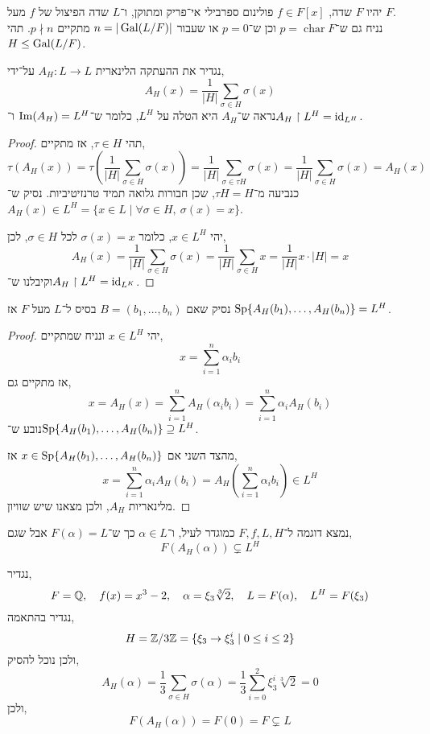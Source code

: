 \question{}
יהיו $F$ שדה, $f \in F[x]$ פולינום ספרבילי אי־פריק ומתוקן, ו־$L$ שדה הפיצול של $f$ מעל $F$. \\
נניח גם ש־$p = \operatorname{char} F$ וכן ש־$p = 0$ או שעבור $n = | \operatorname{Gal}(L / F) |$ מתקיים $p \nmid n$.
תהי $H \le \operatorname{Gal}(L / F)$.

\subquestion{}
נגדיר את ההעתקה הלינארית $A_H : L \to L$ על־ידי,
\[
	A_H(x)
	= \frac{1}{|H|} \sum_{\sigma \in H} \sigma(x)
\]
נראה ש־$A_H$ היא הטלה על $L^H$,
כלומר ש־$\operatorname{Im}(A_H) = L^H$ ו־$A_H \restriction L^H = \operatorname{id}_{L^H}$.
\begin{proof}
	תהי $\tau \in H$, אז מתקיים,
	\[
		\tau(A_H(x))
		= \tau(\frac{1}{|H|} \sum_{\sigma \in H} \sigma(x))
		= \frac{1}{|H|} \sum_{\sigma \in \tau H} \sigma(x)
		= \frac{1}{|H|} \sum_{\sigma \in H} \sigma(x)
		= A_H(x)
	\]
	כנביעה מ־$\tau H = H$, שכן חבורות גלואה תמיד טרנזיטיביות.
	נסיק ש־$A_H(x) \in L^H = \{ x \in L \mid \forall \sigma \in H,\ \sigma(x) = x \}$.

	יהי $x \in L^H$, כלומר $\sigma(x) = x$ לכל $\sigma \in H$, לכן,
	\[
		A_H(x)
		= \frac{1}{|H|} \sum_{\sigma \in H} \sigma(x)
		= \frac{1}{|H|} \sum_{\sigma \in H} x
		= \frac{1}{|H|} x \cdot |H|
		= x
	\]
	וקיבלנו ש־$A_H \restriction L^H = \operatorname{id}_{L^K}$.
\end{proof}

\subquestion{}
נסיק שאם $B = (b_1, \ldots, b_n)$ בסיס ל־$L$ מעל $F$ אז $\operatorname{Sp}\{ A_H(b_1), \ldots, A_H(b_n)\} = L^H$.
\begin{proof}
	יהי $x \in L^H$ ונניח שמתקיים,
	\[
		x
		= \sum_{i = 1}^n \alpha_i b_i
	\]
	אז מתקיים גם,
	\[
		x
		= A_H(x)
		= \sum_{i = 1}^n A_H(\alpha_i b_i)
		= \sum_{i = 1}^n \alpha_i A_H(b_i)
	\]
	נובע ש־$\operatorname{Sp}\{ A_H(b_1), \ldots, A_H(b_n)\} \supseteq L^H$.

	מהצד השני אם $x \in \operatorname{Sp}\{ A_H(b_1), \ldots, A_H(b_n)\}$ אז,
	\[
		x
		= \sum_{i = 1}^n \alpha_i A_H(b_i)
		= A_H\left(\sum_{i = 1}^n \alpha_i b_i\right)
		\in L^H
	\]
	מלינאריות $A_H$, ולכן מצאנו שיש שוויון.
\end{proof}

\pagebreak
\subquestion{}
נמצא דוגמה ל־$F, f, L, H$ כמוגדר לעיל, ו־$\alpha \in L$ כך ש־$F(\alpha) = L$ אבל שגם,
\[
	F(A_H(\alpha)) \subsetneq L^H
\]
\begin{solution}
	נגדיר,
	\[
		F = \mathbb{Q},
		\quad
		f(x) = x^3 - 2,
		\quad
		\alpha = \xi_3 \sqrt[3]{2},
		\quad
		L = F(\alpha),
		\quad
		L^H = F(\xi_3)
	\]
	נגדיר בהתאמה,
	\[
		H
		= \mathbb{Z} / 3\mathbb{Z}
		= \{ \xi_3 \to \xi_3^i \mid 0 \le i \le 2 \}
	\]
	ולכן נוכל להסיק,
	\[
		A_H(\alpha)
		= \frac{1}{3} \sum_{\sigma \in H} \sigma(\alpha)
		= \frac{1}{3} \sum_{i = 0}^2 \xi_3^i \sqrt[3]{2}
		= 0
	\]
	ולכן,
	\[
		F(A_H(\alpha))
		= F(0)
		= F
		\subsetneq L
	\]
\end{solution}


